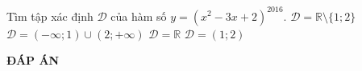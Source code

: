 \begin{ex}%
	Tìm tập xác định $ \mathscr{D} $ của hàm số $ y = (x^2 - 3x + 2)^{ 2016 } $.
	\choice
	{ $ \mathscr{D} = \mathbb{R} \setminus \{1 ;2 \} $}
	{$ \mathscr{D} = (- \infty; 1) \cup (2 ; + \infty) $}
	{\True $ \mathscr{D} = \mathbb{R} $}
	{$ \mathscr{D} =  (1;2)$}
\end{ex}

\newpage
\begin{center}
	\textbf{ĐÁP ÁN}
\end{center}
\begin{multicols}{5}
	 
\end{multicols}
